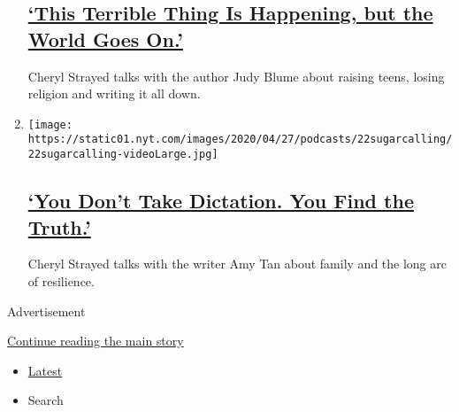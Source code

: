 \begin{enumerate}
  \hypertarget{this-terrible-thing-is-happening-but-the-world-goes-on}{%
  \subsection{\texorpdfstring{\href{/2020/04/29/podcasts/sugar-calling-judy-blume-quarantine-virus.html}{`This
  Terrible Thing Is Happening, but the World Goes
  On.'}}{`This Terrible Thing Is Happening, but the World Goes On.'}}\label{this-terrible-thing-is-happening-but-the-world-goes-on}}

  Cheryl Strayed talks with the author Judy Blume about raising teens,
  losing religion and writing it all down.
\item
  \texttt{[image: https://static01.nyt.com/images/2020/04/27/podcasts/22sugarcalling/22sugarcalling-videoLarge.jpg]}

  \hypertarget{you-dont-take-dictation-you-find-the-truth}{%
  \subsection{\texorpdfstring{\href{/2020/04/22/podcasts/sugar-calling-amy-tan-quarantine-virus.html}{`You
  Don't Take Dictation. You Find the
  Truth.'}}{`You Don't Take Dictation. You Find the Truth.'}}\label{you-dont-take-dictation-you-find-the-truth}}

  Cheryl Strayed talks with the writer Amy Tan about family and the long
  arc of resilience.
\end{enumerate}

Advertisement

\protect\hyperlink{after-mid4}{Continue reading the main story}

\begin{itemize}
\tightlist
\item
  \protect\hyperlink{stream-panel}{Latest}
\item
  Search
\end{itemize}

